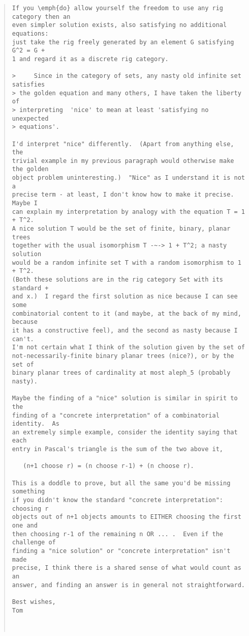 \begin{quote}
\begin{verbatim}
If you \emph{do} allow yourself the freedom to use any rig category then an
even simpler solution exists, also satisfying no additional equations:
just take the rig freely generated by an element G satisfying G^2 = G +
1 and regard it as a discrete rig category.

>     Since in the category of sets, any nasty old infinite set satisfies
> the golden equation and many others, I have taken the liberty of
> interpreting  'nice' to mean at least 'satisfying no unexpected
> equations'.

I'd interpret "nice" differently.  (Apart from anything else, the
trivial example in my previous paragraph would otherwise make the golden
object problem uninteresting.)  "Nice" as I understand it is not a
precise term - at least, I don't know how to make it precise.  Maybe I
can explain my interpretation by analogy with the equation T = 1 + T^2. 
A nice solution T would be the set of finite, binary, planar trees
together with the usual isomorphism T -~-> 1 + T^2; a nasty solution
would be a random infinite set T with a random isomorphism to 1 + T^2. 
(Both these solutions are in the rig category Set with its standard +
and x.)  I regard the first solution as nice because I can see some
combinatorial content to it (and maybe, at the back of my mind, because
it has a constructive feel), and the second as nasty because I can't. 
I'm not certain what I think of the solution given by the set of
not-necessarily-finite binary planar trees (nice?), or by the set of
binary planar trees of cardinality at most aleph_5 (probably nasty).

Maybe the finding of a "nice" solution is similar in spirit to the
finding of a "concrete interpretation" of a combinatorial identity.  As
an extremely simple example, consider the identity saying that each
entry in Pascal's triangle is the sum of the two above it,

   (n+1 choose r) = (n choose r-1) + (n choose r).

This is a doddle to prove, but all the same you'd be missing something
if you didn't know the standard "concrete interpretation": choosing r
objects out of n+1 objects amounts to EITHER choosing the first one and
then choosing r-1 of the remaining n OR ... .  Even if the challenge of
finding a "nice solution" or "concrete interpretation" isn't made
precise, I think there is a shared sense of what would count as an
answer, and finding an answer is in general not straightforward.

Best wishes,
Tom



\end{verbatim}
\end{quote}
